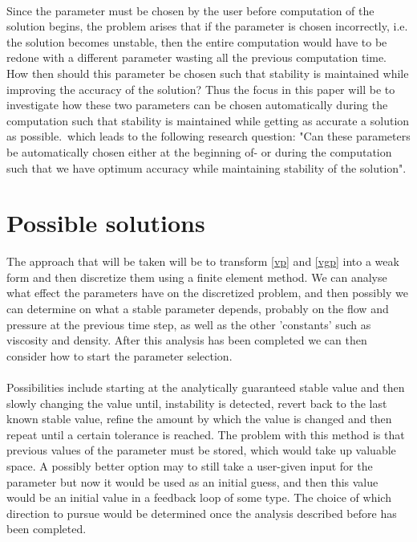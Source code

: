 \\
Since the parameter must be chosen by the user before computation of the solution begins, the problem arises that if the parameter is chosen incorrectly, i.e. the solution becomes unstable, then the entire computation would have to be redone with a different parameter wasting all the previous computation time. How then should this parameter be chosen such that stability is maintained while improving the accuracy of the solution? Thus the focus in this paper will be to investigate how these two parameters can be chosen automatically during the computation such that stability is maintained while getting as accurate a solution as possible.\, which leads to the following research question: "Can these parameters be automatically chosen either at the beginning of- or during the computation such that we have optimum accuracy while maintaining stability of the solution".

\section{Possible solutions}

The approach that will be taken will be to transform \ref{vp} and \ref{vgp} into a weak form and then discretize them using a finite element method. We can analyse what effect the parameters have on the discretized problem, and then possibly we can determine on what a stable parameter depends, probably on the flow and pressure at the previous time step, as well as the other 'constants' such as viscosity and density. After this analysis has been completed we can then consider how to start the parameter selection.\\
\\
Possibilities include starting at the analytically guaranteed stable value and then slowly changing the value until, instability is detected, revert back to the last known stable value, refine the amount by which the value is changed and then repeat until a certain tolerance is reached. The problem with this method is that previous values of the  parameter must be stored, which would take up valuable space. A possibly better option may to still take a user-given input for the parameter but now it would be used as an initial guess, and then this value would be an initial value in a feedback loop of some type. The choice of which direction to pursue would be determined once the analysis described before has been completed.